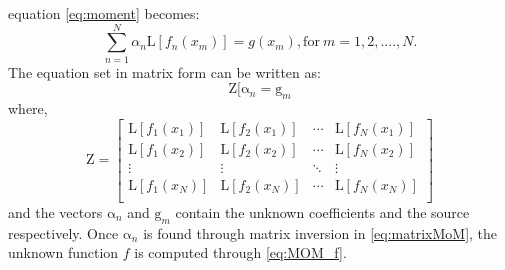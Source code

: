 \documentclass[11pt]{article}
\renewcommand{\^}{\hat}  %
\begin{document}
%
equation \eqref{eq:moment} becomes:
%
\begin{equation}
  \sum \limits_{n = 1}^N \alpha_n  \mathrm L [f_n(x_m)]  = g(x_m), \text{for}\ m = 1,2,....,N.
  \label{eq:moment}
\end{equation}
%
The equation set in matrix form can be written as:
%
\begin{equation}
  \mathrm Z[\mathrm \alpha_n = \mathrm g_m
  \label{eq:matrixMoM}
\end{equation}
%
where,
\begin{equation}
  \mathrm Z =
  \begin{bmatrix}
    \mathrm L [f_1(x_1)] & \mathrm L [f_2(x_1)] & \cdots & \mathrm L [f_N(x_1)] \\
    \mathrm L [f_1(x_2)] & \mathrm L [f_2(x_2)] & \cdots & \mathrm L [f_N(x_2)] \\
    \vdots & \vdots & \ddots & \vdots \\
    \mathrm L [f_1(x_N)] & \mathrm L [f_2(x_N)] & \cdots & \mathrm L [f_N(x_N)] \\
  \end{bmatrix}
  \label{eq:Zmat}
\end{equation}
%
and the vectors $\mathrm \alpha_n$ and $\mathrm g_m$ contain the unknown coefficients and the source respectively. Once $\mathrm \alpha_n$ is found through matrix inversion in \eqref{eq:matrixMoM}, the unknown function $f$ is computed through \eqref{eq:MOM_f}.
\end{document}

